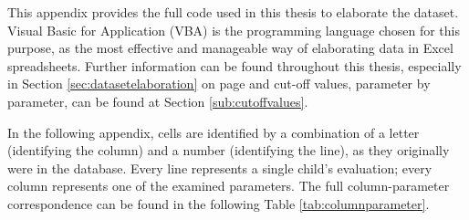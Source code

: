 \label{chap:appendixvbaexpressions}
This appendix provides the full code used in this thesis to elaborate the dataset. Visual Basic for Application (VBA) is the programming language chosen for this purpose, as the most effective and manageable way of elaborating data in Excel spreadsheets. Further information can be found throughout this thesis, especially in Section \ref{sec:datasetelaboration} on page \pageref{sec:datasetelaboration} and cut-off values, parameter by parameter, can be found at Section \ref{sub:cutoffvalues}.

In the following appendix, cells are identified by a combination of a letter (identifying the column) and a number (identifying the line), as they originally were in the database. Every line represents a single child's evaluation; every column represents one of the examined parameters. The full column-parameter correspondence can be found in the following Table \ref{tab:columnparameter}.

\newpage


